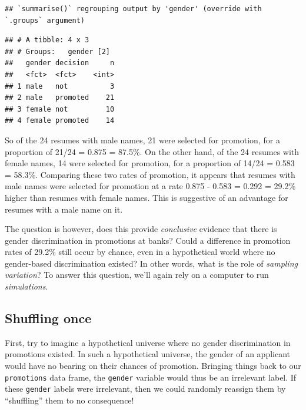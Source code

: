 \documentclass[
]{book}
\newenvironment{Shaded}{\begin{snugshade}}{\end{snugshade}}
\newcommand{\DataTypeTok}[1]{\textcolor[rgb]{0.13,0.29,0.53}{#1}}
\newcommand{\KeywordTok}[1]{\textcolor[rgb]{0.13,0.29,0.53}{\textbf{#1}}}
\newcommand{\NormalTok}[1]{#1}
\newcommand{\OperatorTok}[1]{\textcolor[rgb]{0.81,0.36,0.00}{\textbf{#1}}}
\newcommand{\StringTok}[1]{\textcolor[rgb]{0.31,0.60,0.02}{#1}}
\begin{document}
\begin{Shaded}
\end{Shaded}

\begin{verbatim}
## `summarise()` regrouping output by 'gender' (override with `.groups` argument)
\end{verbatim}

\begin{verbatim}
## # A tibble: 4 x 3
## # Groups:   gender [2]
##   gender decision     n
##   <fct>  <fct>    <int>
## 1 male   not          3
## 2 male   promoted    21
## 3 female not         10
## 4 female promoted    14
\end{verbatim}

So of the 24 resumes with male names, 21 were selected for promotion, for a proportion of 21/24 = 0.875 = 87.5\%. On the other hand, of the 24 resumes with female names, 14 were selected for promotion, for a proportion of 14/24 = 0.583 = 58.3\%. Comparing these two rates of promotion, it appears that resumes with male names were selected for promotion at a rate 0.875 - 0.583 = 0.292 = 29.2\% higher than resumes with female names. This is suggestive of an advantage for resumes with a male name on it.

The question is however, does this provide \emph{conclusive} evidence that there is gender discrimination in promotions at banks? Could a difference in promotion rates of 29.2\% still occur by chance, even in a hypothetical world where no gender-based discrimination existed? In other words, what is the role of \emph{sampling variation}? To answer this question, we'll again rely on a computer to run \emph{simulations}.

\hypertarget{shuffling-once}{%
\subsection{Shuffling once}\label{shuffling-once}}

First, try to imagine a hypothetical universe where no gender discrimination in promotions existed. In such a hypothetical universe, the gender of an applicant would have no bearing on their chances of promotion. Bringing things back to our \texttt{promotions} data frame, the \texttt{gender} variable would thus be an irrelevant label. If these \texttt{gender} labels were irrelevant, then we could randomly reassign them by ``shuffling'' them to no consequence!
\end{document}
